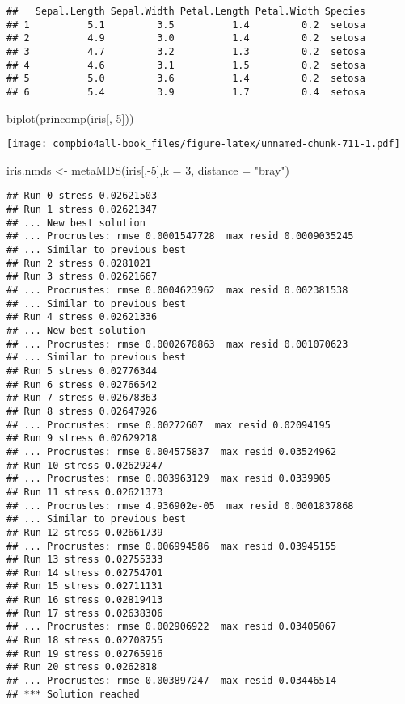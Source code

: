 \documentclass[
]{book}
\newenvironment{Shaded}{\begin{snugshade}}{\end{snugshade}}
\newcommand{\AttributeTok}[1]{\textcolor[rgb]{0.77,0.63,0.00}{#1}}
\newcommand{\DecValTok}[1]{\textcolor[rgb]{0.00,0.00,0.81}{#1}}
\newcommand{\FunctionTok}[1]{\textcolor[rgb]{0.00,0.00,0.00}{#1}}
\newcommand{\NormalTok}[1]{#1}
\newcommand{\OtherTok}[1]{\textcolor[rgb]{0.56,0.35,0.01}{#1}}
\newcommand{\SpecialCharTok}[1]{\textcolor[rgb]{0.00,0.00,0.00}{#1}}
\newcommand{\StringTok}[1]{\textcolor[rgb]{0.31,0.60,0.02}{#1}}
\begin{document}
\begin{verbatim}
##   Sepal.Length Sepal.Width Petal.Length Petal.Width Species
## 1          5.1         3.5          1.4         0.2  setosa
## 2          4.9         3.0          1.4         0.2  setosa
## 3          4.7         3.2          1.3         0.2  setosa
## 4          4.6         3.1          1.5         0.2  setosa
## 5          5.0         3.6          1.4         0.2  setosa
## 6          5.4         3.9          1.7         0.4  setosa
\end{verbatim}

\begin{Shaded}
\begin{Highlighting}[]
\FunctionTok{biplot}\NormalTok{(}\FunctionTok{princomp}\NormalTok{(iris[,}\SpecialCharTok{{-}}\DecValTok{5}\NormalTok{]))}
\end{Highlighting}
\end{Shaded}

\texttt{[image: compbio4all-book\_files/figure-latex/unnamed-chunk-711-1.pdf]}

\begin{Shaded}
\begin{Highlighting}[]
\NormalTok{iris.nmds }\OtherTok{\textless{}{-}} \FunctionTok{metaMDS}\NormalTok{(iris[,}\SpecialCharTok{{-}}\DecValTok{5}\NormalTok{],}\AttributeTok{k =} \DecValTok{3}\NormalTok{,}
                          \AttributeTok{distance =} \StringTok{"bray"}\NormalTok{)}
\end{Highlighting}
\end{Shaded}

\begin{verbatim}
## Run 0 stress 0.02621503 
## Run 1 stress 0.02621347 
## ... New best solution
## ... Procrustes: rmse 0.0001547728  max resid 0.0009035245 
## ... Similar to previous best
## Run 2 stress 0.0281021 
## Run 3 stress 0.02621667 
## ... Procrustes: rmse 0.0004623962  max resid 0.002381538 
## ... Similar to previous best
## Run 4 stress 0.02621336 
## ... New best solution
## ... Procrustes: rmse 0.0002678863  max resid 0.001070623 
## ... Similar to previous best
## Run 5 stress 0.02776344 
## Run 6 stress 0.02766542 
## Run 7 stress 0.02678363 
## Run 8 stress 0.02647926 
## ... Procrustes: rmse 0.00272607  max resid 0.02094195 
## Run 9 stress 0.02629218 
## ... Procrustes: rmse 0.004575837  max resid 0.03524962 
## Run 10 stress 0.02629247 
## ... Procrustes: rmse 0.003963129  max resid 0.0339905 
## Run 11 stress 0.02621373 
## ... Procrustes: rmse 4.936902e-05  max resid 0.0001837868 
## ... Similar to previous best
## Run 12 stress 0.02661739 
## ... Procrustes: rmse 0.006994586  max resid 0.03945155 
## Run 13 stress 0.02755333 
## Run 14 stress 0.02754701 
## Run 15 stress 0.02711131 
## Run 16 stress 0.02819413 
## Run 17 stress 0.02638306 
## ... Procrustes: rmse 0.002906922  max resid 0.03405067 
## Run 18 stress 0.02708755 
## Run 19 stress 0.02765916 
## Run 20 stress 0.0262818 
## ... Procrustes: rmse 0.003897247  max resid 0.03446514 
## *** Solution reached
\end{verbatim}
\end{document}
